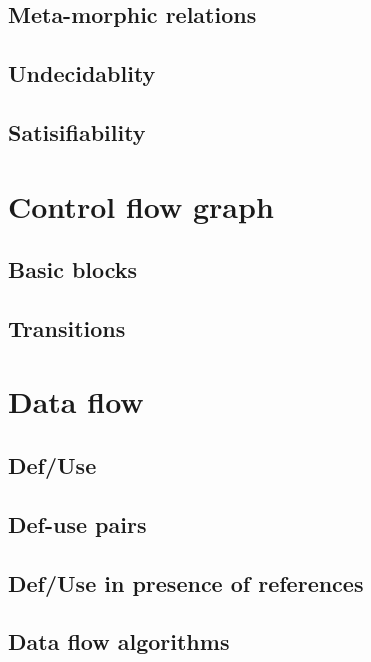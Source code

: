 \documentclass{article}
\begin{document}
\subsection{Meta-morphic relations} 
\subsection{Undecidablity} 
\subsection{Satisifiability} 

\section{Control flow graph} 
\subsection{Basic blocks} 
\subsection{Transitions} 
 
\section{Data flow} 
\subsection{Def/Use} 
\subsection{Def-use pairs} 
\subsection{Def/Use in presence of references} 
\subsection{Data flow algorithms}
\end{document}
